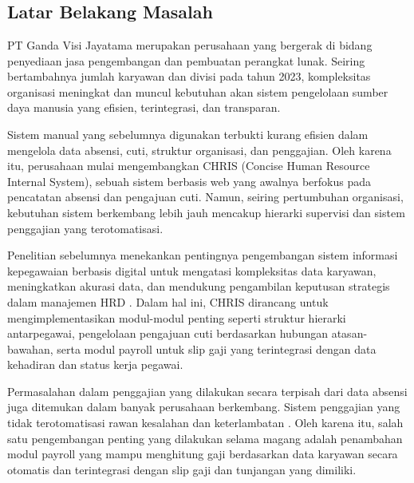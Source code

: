 \chapter{\babSatu}

\section{Latar Belakang Masalah}
PT Ganda Visi Jayatama merupakan perusahaan yang bergerak di bidang penyediaan 
jasa pengembangan dan pembuatan perangkat lunak. Seiring bertambahnya jumlah 
karyawan dan divisi pada tahun 2023, kompleksitas organisasi meningkat dan 
muncul kebutuhan akan sistem pengelolaan sumber daya manusia yang efisien, 
terintegrasi, dan transparan.

Sistem manual yang sebelumnya digunakan terbukti kurang efisien dalam 
mengelola data absensi, cuti, struktur organisasi, dan penggajian. Oleh karena itu, 
perusahaan mulai mengembangkan CHRIS (Concise Human Resource Internal System), 
sebuah sistem berbasis web yang awalnya berfokus pada pencatatan absensi dan 
pengajuan cuti. Namun, seiring pertumbuhan organisasi, kebutuhan sistem berkembang 
lebih jauh mencakup hierarki supervisi dan sistem penggajian yang terotomatisasi.

Penelitian sebelumnya menekankan pentingnya pengembangan sistem informasi 
kepegawaian berbasis digital untuk mengatasi kompleksitas data karyawan, 
meningkatkan akurasi data, dan mendukung pengambilan keputusan strategis 
dalam manajemen HRD \cite{zykov2006hris}. Dalam hal ini, CHRIS dirancang untuk 
mengimplementasikan modul-modul penting seperti struktur hierarki antarpegawai, 
pengelolaan pengajuan cuti berdasarkan hubungan atasan-bawahan, serta modul 
payroll untuk slip gaji yang terintegrasi dengan data kehadiran dan status kerja 
pegawai.

Permasalahan dalam penggajian yang dilakukan secara terpisah dari data absensi 
juga ditemukan dalam banyak perusahaan berkembang. Sistem penggajian yang tidak 
terotomatisasi rawan kesalahan dan keterlambatan \cite{aina2025payroll}. Oleh karena itu, salah satu 
pengembangan penting yang dilakukan selama magang adalah penambahan modul 
payroll yang mampu menghitung gaji berdasarkan data karyawan secara otomatis 
dan terintegrasi dengan slip gaji dan tunjangan yang dimiliki.


